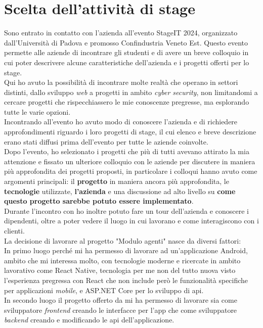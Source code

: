 \section{Scelta dell'attività di stage}
Sono entrato in contatto con l'azienda all'evento StageIT 2024, organizzato dall'Università di Padova e promosso Confindustria 
Veneto Est. Questo evento permette alle aziende di incontrare gli studenti e di avere un breve colloquio in cui poter 
descrivere alcune caratteristiche dell'azienda e i progetti offerti per lo stage.\\
Qui ho avuto la possibilità di incontrare molte realtà che operano in settori distinti, dallo sviluppo \textit{web} a progetti in 
ambito \textit{cyber security}, non limitandomi a cercare progetti che rispecchiassero le mie conoscenze pregresse, ma esplorando tutte le 
varie opzioni.\\
Incontrando {\company} all'evento ho avuto modo di conoscere l'azienda e di richiedere approfondimenti riguardo i loro progetti di 
stage, il cui elenco e breve descrizione erano stati diffusi prima dell'evento per tutte le aziende coinvolte.\\
Dopo l'evento, ho selezionato i progetti che più di tutti avevano attirato la mia attenzione e fissato un ulteriore colloquio con 
le aziende per discutere in maniera più approfondita dei progetti proposti, in particolare i colloqui hanno avuto come argomenti 
principali: il \textbf{progetto} in maniera ancora più approfondita, le \textbf{tecnologie} utilizzate, \textbf{l'azienda} e una discussione ad alto livello 
su \textbf{come questo progetto sarebbe potuto essere implementato}.\\
Durante l'incontro con {\company} ho inoltre potuto fare un tour dell'azienda e conoscere i dipendenti, oltre a poter 
vedere il luogo in cui lavorano e come interagiscono con i clienti.\\
La decisione di lavorare al progetto "Modulo agenti" nasce da diversi fattori:\\
In primo luogo perché mi ha permesso di lavorare ad un'applicazione Android, ambito che mi interessa molto, con tecnologie 
moderne e ricercate in ambito lavorativo come React Native, tecnologia per me non del tutto nuova visto l'esperienza 
pregressa con React che non include però le funzionalità specifiche per applicazioni \textit{mobile}, e ASP.NET Core per 
lo sviluppo di \gls{api}.\\
In secondo luogo il progetto offerto da {\company} mi ha permesso di lavorare sia come sviluppatore \textit{frontend} 
creando le interfacce per l'app che come sviluppatore \textit{backend} creando e modificando le \gls{api} dell'applicazione. 
